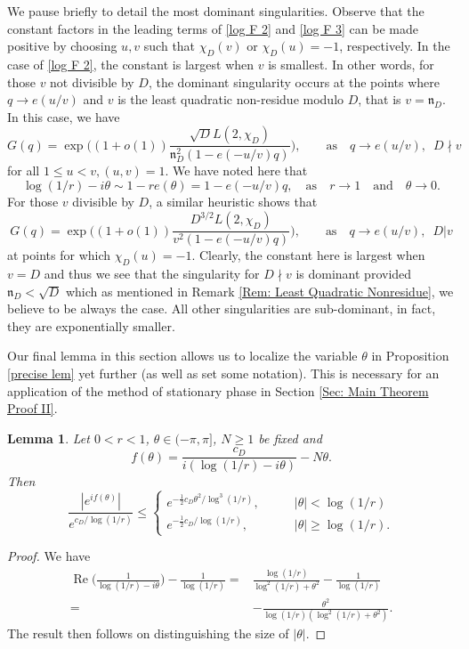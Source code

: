 \documentclass[11pt]{amsart}
\numberwithin{equation}{section}
\newcommand{\mf}{\mathfrak}
\newtheorem{lem}[thm]{Lemma}
\theoremstyle{remark}
\begin{document}
We pause briefly to detail the most dominant singularities. Observe that the constant factors in the leading terms of \eqref{log F 2} and \eqref{log F 3} can be made positive by choosing $u,v$ such that $\chi_D(v)$ or $\chi_D(u)=-1$, respectively. In the case of \eqref{log F 2}, the constant is largest when $v$ is smallest.  In other words, for those $v$ not divisible by $D$, the dominant singularity occurs at the points where $q\to e(u/v)$ and $v$ is the least quadratic non-residue modulo $D$, that is $v=\mf{n}_D$. In this case, we have 
\[
G(q)=\exp\bigg((1+o(1))\frac{\sqrt{D}L(2,\chi_D)}{\mf{n}_D^2(1-e(-u/v)q)}\bigg),\qquad \textrm{as} \quad q\to e(u/v),\,\,\, D\nmid v 
\] 
for all $1\leq u< v, (u,v)=1$. We have noted here that
\[
\log (1/r)-i \theta \sim 1-r e(\theta) =1-e(-u/v)q, \quad \textrm{as} \quad r \to 1 \quad \textrm{and} \quad \theta \to 0. 
\]
For those $v$ divisible by $D$, a similar heuristic shows that  
\[   G(q)=\exp\bigg((1+o(1))\frac{D^{3/2}L(2,\chi_D)}{v^2(1-e(-u/v)q)}\bigg),\qquad \textrm{as} \quad q\to e(u/v),\,\,\, D|v  
\] 
at points for which $\chi_D(u)=-1$. Clearly, the constant here is largest when $v=D$ and thus we see that the singularity for $D\nmid v$ is dominant provided $\mf{n}_D<\sqrt{D}$ which as mentioned in Remark \ref{Rem: Least Quadratic Nonresidue}, we believe to be always the case. All other singularities are sub-dominant, in fact, they are exponentially smaller.

Our final lemma in this section allows us to localize the variable $\theta$ in Proposition \ref{precise lem} 
 yet further (as well as set some notation). This is necessary for an application of the method of stationary phase in Section \ref{Sec: Main Theorem Proof II}.  

\begin{lem}\label{local lem}
Let $0<r<1$, $\theta\in(-\pi,\pi ]$, $N \geq 1$ be fixed and
\[
f(\theta)=\frac{c_D}{ i(\log(1/r)-i\theta)}-N\theta.
\] 
 Then
 \[
\frac{|e^{if(\theta)}|}{e^{c_D/\log(1/r)}}
\leq
\begin{cases}
e^{-\tfrac12c_D\theta^2/\log^3(1/r)},\qquad &|\theta|<\log(1/r)
\\
e^{-\tfrac12c_D/\log(1/r)},\qquad &|\theta|\geq \log(1/r).
\end{cases} 
\]
\end{lem}
\begin{proof}We have 
\begin{align*}
\operatorname{Re}\bigg(\frac{1}{\log(1/r)-{i\theta}}\bigg)-\frac{1}{\log(1/r)}
= &
\frac{\log(1/r)}{\log^2(1/r)+\theta^2}-\frac{1}{\log(1/r)}
\\
= &
-\frac{\theta^2}{\log(1/r)(\log^2(1/r)+\theta^2)}.
\end{align*}
The result then follows on distinguishing the size of $|\theta|$.
\end{proof}
\end{document}
